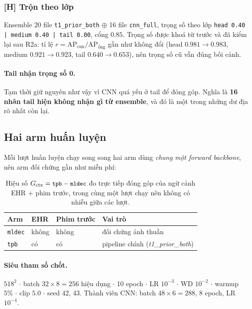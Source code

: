 \documentclass[11pt,a4paper]{article}
\newcommand{\code}[1]{\texttt{\small #1}}
\begin{document}
\subsubsection*{[H] Trộn theo lớp}

Ensemble 20 file \code{t1\_prior\_both} $\oplus$ 16 file \code{cnn\_full}, trọng số
theo lớp \code{head 0.40 | medium 0.40 | tail 0.00}, cổng $0.85$. Trọng số được khoá
từ trước và đã kiểm lại sau R2a: tỉ lệ $r = \text{AP}_{\text{cnn}}/\text{AP}_{\text{ống}}$
gần như không đổi (head $0.981 \to 0.983$, medium $0.921 \to 0.923$, tail
$0.640 \to 0.653$), nên trọng số cũ vẫn đúng bối cảnh.

\paragraph{Tail nhận trọng số 0.} Tạm thời giữ nguyên như vậy vì CNN quá yếu ở tail để
đóng góp. Nghĩa là \textbf{16 nhãn tail hiện không nhận gì từ ensemble}, và đó là một
trong những dư địa rõ nhất còn lại.

\subsection{Hai arm huấn luyện}

Mỗi lượt huấn luyện chạy song song hai arm dùng \emph{chung một forward backbone},
nên arm đối chứng gần như miễn phí:

\begin{table}[h]
\centering
\small
\begin{tabular}{@{}llll@{}}
\toprule
\textbf{Arm} & \textbf{EHR} & \textbf{Phim trước} & \textbf{Vai trò} \\
\midrule
\code{mldec} & không & không & đối chứng ảnh thuần \\
\code{tpb}   & có    & có    & pipeline chính (\emph{t1\_prior\_both}) \\
\bottomrule
\end{tabular}
\caption{Hiệu số $G_{\text{ctx}} = \code{tpb} - \code{mldec}$ đo trực tiếp đóng góp của
ngữ cảnh EHR + phim trước, trong cùng một lượt chạy nên không có nhiễu giữa các lượt.}
\end{table}

\paragraph{Siêu tham số chốt.} $518^2$ $\cdot$ batch $32\times8 = 256$ hiệu dụng $\cdot$
10 epoch $\cdot$ LR $10^{-3}$ $\cdot$ WD $10^{-2}$ $\cdot$ warmup $5\%$ $\cdot$ clip $5.0$
$\cdot$ seed 42, 43. Thành viên CNN: batch $48\times6 = 288$, 8 epoch, LR $10^{-4}$.
\end{document}
